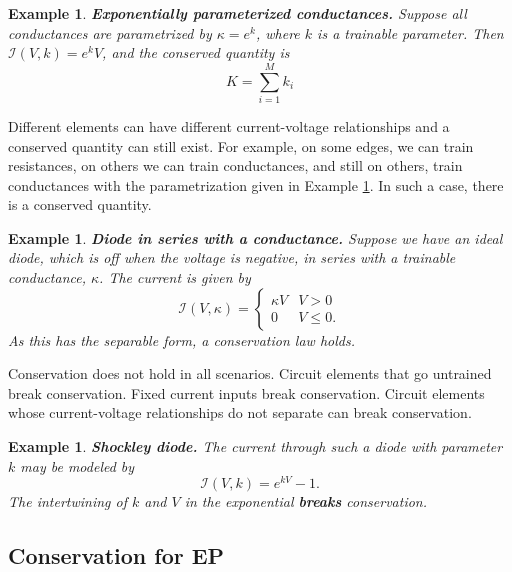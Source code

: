 \documentclass[final, 11pt, nonatbib]{elsarticle}
\theoremstyle{definition}
\theoremstyle{plain}
\newtheorem{example}[definition]{Example}
\numberwithin{equation}{section}
\begin{document}
\begin{example}{\textbf{Exponentially parameterized conductances.}}
Suppose all conductances are parametrized by $\kappa=e^{k}$, where $k$ is a trainable parameter. Then $\mathscr{I}(V,k)= e^{k}V$, and the conserved quantity is
\begin{equation*}
    K = \sum_{i=1}^{M}k_i
\end{equation*}
\label{Ex:exponential_parameter}
\end{example}

Different elements can have different current-voltage relationships and a conserved quantity can still exist. For example, on some edges, we can train resistances, on others we can train conductances, and still on others, train conductances with the parametrization given in Example \ref{Ex:exponential_parameter}. In such a case, there is a conserved quantity.

\begin{example}{\textbf{Diode in series with a conductance.}}
Suppose we have an ideal diode, which is off when the voltage is negative, in series with a trainable conductance, $\kappa$. The current is given by
\begin{equation*}
    \mathscr{I}(V,\kappa) = \begin{cases}
        \kappa V & V>0
        \\ 
        0 & V \leq 0.
    \end{cases}
\end{equation*}
As this has the separable form, a conservation law holds.
\end{example}

Conservation does not hold in all scenarios. Circuit elements that go untrained break conservation. Fixed current inputs break conservation. Circuit elements whose current-voltage relationships do not separate can break conservation.

\begin{example}{\textbf{Shockley diode.}}
    The current through such a diode with parameter $k$ may be modeled by
    \[\mathscr{I}(V,k)=e^{kV}-1.\]
    The intertwining of $k$ and $V$ in the exponential { \bf breaks} conservation.
\end{example}


\subsection{Conservation for EP}
\label{EP C Laws}
\end{document}
